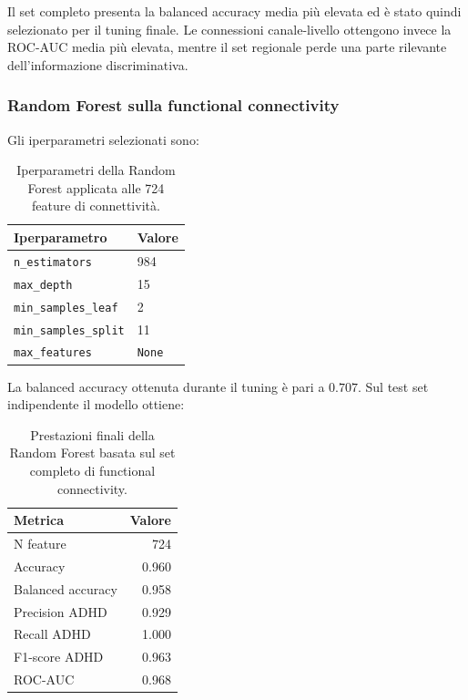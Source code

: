 Il set completo presenta la balanced accuracy media più elevata ed è
stato quindi selezionato per il tuning finale. Le connessioni
canale-livello ottengono invece la ROC-AUC media più elevata, mentre
il set regionale perde una parte rilevante dell'informazione
discriminativa.


\subsubsection{Random Forest sulla functional connectivity}

Gli iperparametri selezionati sono:

\begin{table}[H]
	\centering
	\begin{tabular}{ll}
		\hline
		\textbf{Iperparametro} & \textbf{Valore} \\
		\hline
		\texttt{n\_estimators} & 984 \\
		\texttt{max\_depth} & 15 \\
		\texttt{min\_samples\_leaf} & 2 \\
		\texttt{min\_samples\_split} & 11 \\
		\texttt{max\_features} & \texttt{None} \\
		\hline
	\end{tabular}
	\caption{Iperparametri della Random Forest applicata alle
		724 feature di connettività.}
	\label{tab:rf_connectivity_hyperparameters_updated}
\end{table}

La balanced accuracy ottenuta durante il tuning è pari a $0.707$.
Sul test set indipendente il modello ottiene:

\begin{table}[H]
	\centering
	\begin{tabular}{lr}
		\hline
		\textbf{Metrica} & \textbf{Valore} \\
		\hline
		N feature & 724 \\
		Accuracy & 0.960 \\
		Balanced accuracy & 0.958 \\
		Precision ADHD & 0.929 \\
		Recall ADHD & 1.000 \\
		F1-score ADHD & 0.963 \\
		ROC-AUC & 0.968 \\
		\hline
	\end{tabular}
	\caption{Prestazioni finali della Random Forest basata sul set
		completo di functional connectivity.}
	\label{tab:rf_connectivity_test_updated}
\end{table}

